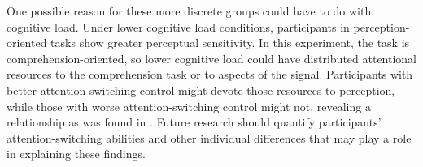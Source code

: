 One possible reason for these more discrete groups could have to do with cognitive load.
Under lower cognitive load conditions, participants in perception-oriented tasks show greater perceptual sensitivity.
In this experiment, the task is comprehension-oriented, so lower cognitive load could have distributed attentional resources to the comprehension task or to aspects of the signal.
Participants with better attention-switching control might devote those resources to perception, while those with worse attention-switching control might not, revealing a relationship as was found in \citet{Scharenborg2013}.
Future research should quantify participants' attention-switching abilities and other individual differences that may play a role in explaining these findings.



